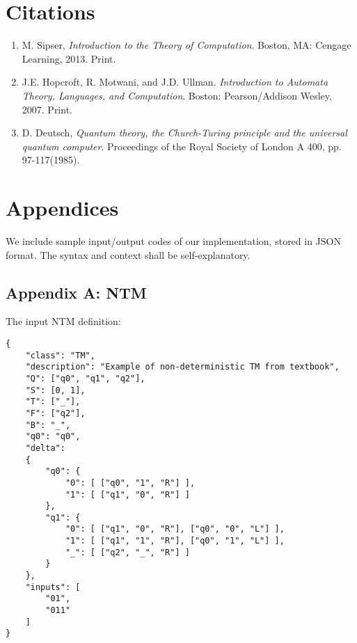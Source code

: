 \documentclass[12pt]{article}  %
\begin{document}
\section{Citations}

\begin{enumerate}
\item M. Sipser, \emph{Introduction to the Theory of Computation}. Boston, MA: Cengage Learning, 2013. Print.

\item J.E. Hopcroft, R. Motwani, and J.D. Ullman. \emph{Introduction to Automata Theory, Languages, and Computation}. Boston: Pearson/Addison Wesley, 2007. Print.

\item D. Deutsch, \emph{Quantum theory, the Church-Turing principle and the universal quantum computer}. Proceedings of the Royal Society of London A 400, pp. 97-117(1985). \label{quantum}
\end{enumerate}





\section{Appendices}
We include sample input/output codes of our implementation, stored in JSON format. The syntax and context shall be self-explanatory.

\subsection{Appendix A: NTM}

The input NTM definition:
\begin{verbatim}
{
    "class": "TM",
    "description": "Example of non-deterministic TM from textbook",
    "Q": ["q0", "q1", "q2"],
    "S": [0, 1],
    "T": ["_"],
    "F": ["q2"],
    "B": "_",
    "q0": "q0",
    "delta":
    {
        "q0": {
            "0": [ ["q0", "1", "R"] ],
            "1": [ ["q1", "0", "R"] ]
        },
        "q1": {
            "0": [ ["q1", "0", "R"], ["q0", "0", "L"] ],
            "1": [ ["q1", "1", "R"], ["q0", "1", "L"] ],
            "_": [ ["q2", "_", "R"] ]
        }
    },
    "inputs": [
        "01",
        "011"
    ]
}
\end{verbatim}
\end{document}

